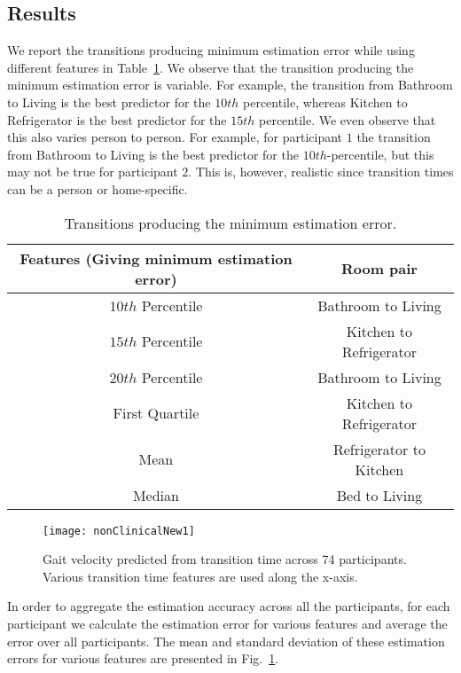 \documentclass[journal]{IEEEtran}
\begin{document}
\subsection{Results}
We report the transitions producing minimum estimation error while using different features in Table~\ref{tab:filter_coeff_2}. 
We observe that the transition producing the minimum estimation error is variable. For example, the transition from Bathroom to Living is the best predictor for the $10th$ percentile, whereas Kitchen to Refrigerator is the best predictor for the $15th$ percentile. We even observe that this also varies person to person. For example, for participant $1$ the transition from Bathroom to Living is the best predictor for the $10th$-percentile, but this may not be true for participant $2$.  This is, however, realistic since transition times can be a person or home-specific.
\begin{table}[t]
\small
\centering
\caption{Transitions producing the minimum estimation error.}
\setlength{\tabcolsep}{1pt}
\resizebox{6cm}{!} {
\begin{tabular}{|c|c|} \hline
\parbox{3.5cm}{\bf  Features (Giving minimum estimation error)}&{\bf Room pair}\\ \hline
$10th$ Percentile&Bathroom to Living  \\ \hline
$15th$ Percentile & Kitchen to Refrigerator \\ \hline
$20th$ Percentile &Bathroom to Living  \\ \hline
First Quartile&Kitchen to Refrigerator\\ \hline
Mean&Refrigerator to Kitchen\\ \hline
Median&Bed to Living\\ \hline
\end{tabular}
}
\label{tab:filter_coeff_2}
\end{table}

\begin{figure}
\centering
\texttt{[image: nonClinicalNew1]}
\caption{Gait velocity predicted from transition time across 74 participants. Various transition time features are used along the x-axis. }
\label{fig:WalkSpeedVersusTransitionTime}
\end{figure}

In order to aggregate the estimation accuracy across all the participants, for each participant we calculate the estimation error for various features and average the error over all participants. The mean and standard deviation of these estimation errors for various features are presented in Fig.~\ref{fig:WalkSpeedVersusTransitionTime}. 
\end{document}
